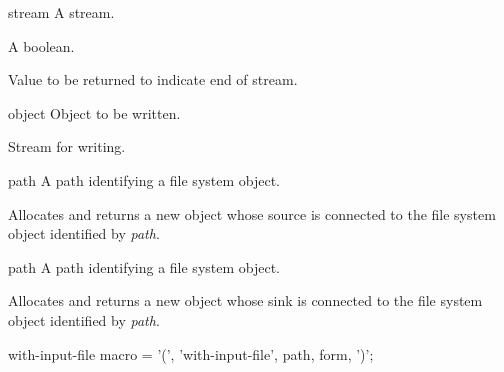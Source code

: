 \begin{optDefinition}
\begin{arguments}
    \item[stream] A stream.
    \item[\optional{eos-error-p}] A boolean.
    \item[\optional{eos-value}] Value to be returned to indicate end of stream.
\end{arguments}

\begin{arguments}
    \item[object] Object to be written.
    \item[\optional{stream}] Stream for writing.
\end{arguments}


\begin{arguments}
    \item[path] A path identifying a file system object.
\end{arguments}
%
\result%
Allocates and returns a new  object whose source
is connected to the file system object identified by {\em path}.

\begin{arguments}
    \item[path] A path identifying a file system object.
\end{arguments}
%
\result%
Allocates and returns a new  object whose sink is
connected to the file system object identified by {\em path}.

\Syntax
\savesyntax\withinputfileSyntax\vbox{\syntax
with-input-file macro
   = '(', 'with-input-file', path,  {form}, ')';
\endsyntax}


\end{optDefinition}
